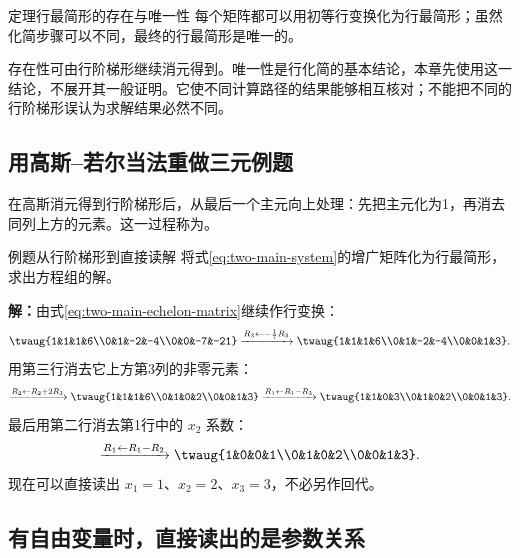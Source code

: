 \documentclass[a4paper,12pt,twoside,openany,fontset=none]{ctexbook}
\newcounter{theorem}[chapter]
\newenvironment{theorem}[1][]{\begin{thmBox}{定理}{#1}}{\end{thmBox}}
\newcounter{example}[chapter]
\newenvironment{example}[1][]{\begin{exBox}{例题}{#1}}{\end{exBox}}
\numberwithin{equation}{chapter}
\begin{document}
\begin{theorem}[行最简形的存在与唯一性]
每个矩阵都可以用初等行变换化为行最简形；虽然化简步骤可以不同，最终的行最简形是唯一的。
\end{theorem}

存在性可由行阶梯形继续消元得到。唯一性是行化简的基本结论，本章先使用这一结论，不展开其一般证明。它使不同计算路径的结果能够相互核对；不能把不同的行阶梯形误认为求解结果必然不同。

\subsection*{用高斯--若尔当法重做三元例题}

在高斯消元得到行阶梯形后，从最后一个主元向上处理：先把主元化为1，再消去同列上方的元素。这一过程称为\textbf{}。

\begin{example}[从行阶梯形到直接读解]
将式\eqref{eq:two-main-system}的增广矩阵化为行最简形，求出方程组的解。
\end{example}

\textbf{解：}由式\eqref{eq:two-main-echelon-matrix}继续作行变换：
\[
 \twaug{1&1&1&6\\0&1&-2&-4\\0&0&-7&-21}
 \xrightarrow{R_3\leftarrow-\frac17R_3}
 \twaug{1&1&1&6\\0&1&-2&-4\\0&0&1&3}.
\]
用第三行消去它上方第3列的非零元素：
\[
 \xrightarrow{R_2\leftarrow R_2+2R_3}
 \twaug{1&1&1&6\\0&1&0&2\\0&0&1&3}
 \xrightarrow{R_1\leftarrow R_1-R_3}
 \twaug{1&1&0&3\\0&1&0&2\\0&0&1&3}.
\]
最后用第二行消去第1行中的 $x_2$ 系数：
\[
 \xrightarrow{R_1\leftarrow R_1-R_2}
 \twaug{1&0&0&1\\0&1&0&2\\0&0&1&3}.
\]
现在可以直接读出 $x_1=1$、$x_2=2$、$x_3=3$，不必另作回代。

\subsection*{有自由变量时，直接读出的是参数关系}
\end{document}

